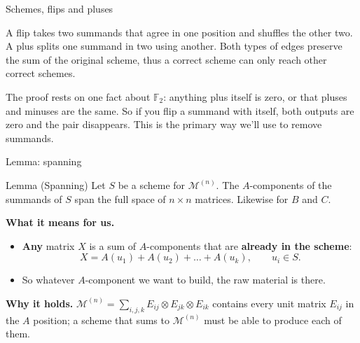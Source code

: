 \documentclass[aspectratio=169,10pt]{beamer}
\newcommand{\F}{\mathbb{F}_2}
\newcommand{\M}{\mathcal{M}^{(n)}}
\begin{document}
\begin{frame}{Schemes, flips and pluses}
{    A flip takes two summands that agree in one position and shuffles the
    other two. A plus splits one summand in two using another. Both types of edges preserve the sum of the original scheme, thus a correct scheme can only reach other correct schemes.

    The proof rests on one fact about $\F$: anything
    plus itself is zero, or that pluses and minuses are the same. So if you flip
    a summand with itself, both outputs are zero and the pair disappears.
    This is the primary way we'll use to remove summands.
  }
\end{frame}

\begin{frame}{Lemma: spanning}
  \begin{block}{Lemma (Spanning)}
    Let $S$ be a scheme for $\M$. The $A$-components of the summands of
    $S$ span the full space of $n\times n$ matrices. Likewise for $B$
    and $C$.
  \end{block}
  \vspace{1ex}
  \textbf{What it means for us.}
  \begin{itemize}
    \item \textbf{Any} matrix $X$ is a sum of $A$-components that are
      \textbf{already in the scheme}:
      \[ X = A(u_1) + A(u_2) + \dots + A(u_k),\qquad u_i \in S. \]
    \item So whatever $A$-component we want to build, the raw material is
      there.
  \end{itemize}
  \vspace{1ex}
  \textbf{Why it holds.}
  $\M = \sum_{i,j,k} E_{ij}\otimes E_{jk}\otimes E_{ik}$ contains every
  unit matrix $E_{ij}$ in the $A$ position; a scheme that sums to $\M$
  must be able to produce each of them.
\end{frame}
\end{document}
